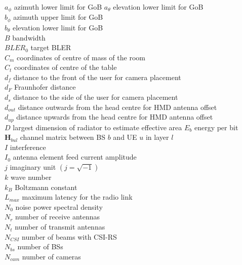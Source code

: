 $a_\phi$ \mytab azimuth lower limit for \acs{GoB} \mynewline
$a_\theta$ \mytab elevation lower limit for \acs{GoB} \\
$b_\phi$ \mytab azimuth upper limit for \acs{GoB} \\
$b_\theta$ \mytab elevation lower limit for \acs{GoB} \\
$B$ \mytab bandwidth \\
$BLER_0$ \mytab target \acs{BLER} \\
$C_m$ \mytab coordinates of centre of mass of the room \\
$C_t$ \mytab coordinates of centre of the table \\
$d_f$ \mytab distance to the front of the user for camera placement \\
$d_F$ \mytab Fraunhofer distance \\
$d_s$ \mytab distance to the side of the user for camera placement \\
$d_{out}$ \mytab distance outwards from the head centre for \acs{HMD} antenna offset\\
$d_{up}$ \mytab distance upwards from the head centre for \acs{HMD} antenna offset\\
$D$ \mytab largest dimension of radiator to estimate effective area \newline
$E_b$ \mytab energy per bit \\
$\bm{H}_{bul}$ \mytab channel matrix between BS $b$ and UE $u$ in layer $l$\\
$I$ \mytab interference\\
$I_0$ \mytab antenna element feed current amplitude\\
$j$ \mytab imaginary unit $\left(j = \sqrt{-1}\right)$\\
$k$ \mytab wave number\\
$k_B$ \mytab Boltzmann constant\\
$L_{max}$ \mytab maximum latency for the radio link \\
$N_0$ \mytab noise power spectral density \\
$N_r$ \mytab number of receive antennas \\
$N_t$ \mytab number of transmit antennas \\
$N_{CSI}$ \mytab number of beams with CSI-RS\\
$N_{bs}$ \mytab number of \acsp{BS} \\
$N_{cam}$ \mytab number of cameras \\
